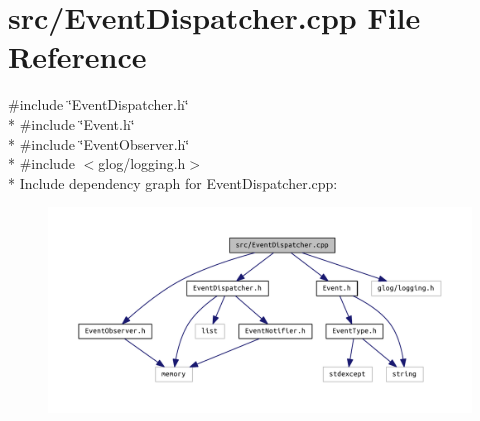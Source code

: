 \section{src/\+Event\+Dispatcher.cpp File Reference}
\label{_event_dispatcher_8cpp}
{\ttfamily \#include \char`\"{}Event\+Dispatcher.\+h\char`\"{}}\\*
{\ttfamily \#include \char`\"{}Event.\+h\char`\"{}}\\*
{\ttfamily \#include \char`\"{}Event\+Observer.\+h\char`\"{}}\\*
{\ttfamily \#include $<$glog/logging.\+h$>$}\\*
Include dependency graph for Event\+Dispatcher.\+cpp\+:\nopagebreak
\begin{figure}[H]
\begin{center}
\leavevmode
\includegraphics[width=350pt]{_event_dispatcher_8cpp__incl}
\end{center}
\end{figure}
